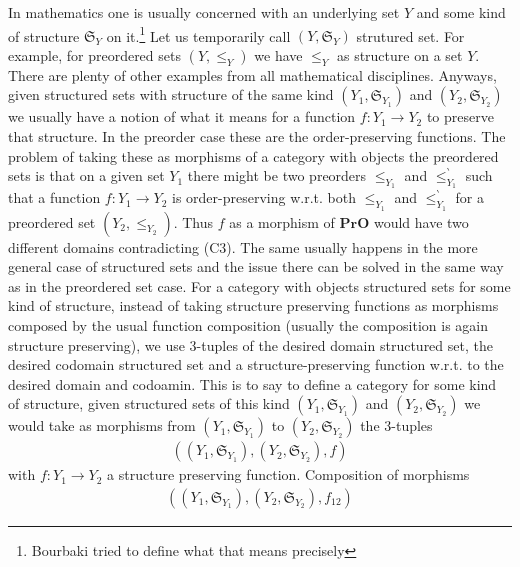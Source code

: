 \begin{rem}[(C3) Trick]
\label{rem:c3trick}
In mathematics one is usually concerned with an underlying set $Y$ and some kind of structure $\mathfrak{S}_{Y}$ on it.\footnote{Bourbaki tried to define what that means precisely} Let us temporarily call $(Y,\mathfrak{S}_{Y})$ strutured set. For example, for preordered sets $(Y,\leq_{Y})$ we have $\leq_{Y}$ as structure on a set $Y$. There are plenty of other examples from all mathematical disciplines. Anyways, given structured sets with structure of the same kind $(Y_{1},\mathfrak{S}_{Y_{1}})$ and $(Y_{2},\mathfrak{S}_{Y_{2}})$ we usually have a notion of what it means for a function $f \colon Y_{1} \rightarrow Y_{2}$ to preserve that structure. In the preorder case these are the order-preserving functions. The problem of taking these as morphisms of a category with objects the preordered sets  is that on a given set $Y_{1}$ there might be two preorders $\leq_{Y_{1}}$ and $\leq_{Y_{1}}^{\backprime}$ such that a function $f \colon Y_{1} \rightarrow Y_{2}$ is order-preserving w.r.t. both $\leq_{Y_{1}}$ and $\leq_{Y_{1}}^{\backprime}$ for a preordered set $(Y_{2},\leq_{Y_{2}})$. Thus $f$ as a morphism of $\mathbf{PrO}$ would have two different domains contradicting (C3). The same usually happens in the more general case of structured sets and the issue there can be solved in the same way as in the preordered set case. For a category with objects structured sets for some kind of structure, instead of taking structure preserving functions as morphisms composed by the usual function composition (usually the composition is again structure preserving), we use $3$-tuples of the desired domain structured set, the desired codomain structured set and a structure-preserving function w.r.t. to the desired domain and codoamin. This is to say to define a category for some kind of structure, given structured sets of this kind $(Y_{1},\mathfrak{S}_{Y_{1}})$ and $(Y_{2},\mathfrak{S}_{Y_{2}})$ we would take as morphisms from $(Y_{1},\mathfrak{S}_{Y_{1}})$ to $(Y_{2},\mathfrak{S}_{Y_{2}})$ the $3$-tuples
\begin{align*}
  \left(
    (Y_{1},\mathfrak{S}_{Y_{1}}),
    (Y_{2},\mathfrak{S}_{Y_{2}}),
    f
  \right)
\end{align*}
with $f \colon Y_{1} \rightarrow Y_{2}$ a structure preserving function. Composition of morphisms
\begin{align*}
  \left(
    (Y_{1},\mathfrak{S}_{Y_{1}}),
    (Y_{2},\mathfrak{S}_{Y_{2}}),
    f_{12}
  \right)
\end{align*}

\end{rem}
